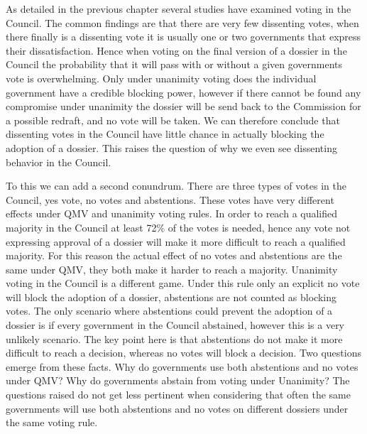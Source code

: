 As detailed in the previous chapter several studies have examined voting in the Council. The common findings are that there are very few dissenting votes, when there finally is a dissenting vote it is usually one or two governments that express their dissatisfaction. Hence when voting on the final version of a dossier in the Council the probability that it will pass with or without a given governments vote is overwhelming. Only under unanimity voting does the individual government have a credible blocking power, however if there cannot be found any compromise under unanimity the dossier will be send back to the Commission for a possible redraft, and no vote will be taken. We can therefore conclude that dissenting votes in the Council have little chance in actually blocking the adoption of a dossier. This raises the question of why we even see dissenting behavior in the Council. 

To this we can add a second conundrum. There are three types of votes in the Council, yes vote, no votes and abstentions. These votes have very different effects under QMV and unanimity voting rules. In order to reach a qualified majority in the Council at least 72\% of the votes is needed, hence any vote not expressing approval of a dossier will make it more difficult to reach a qualified majority. For this reason the actual effect of no votes and abstentions are the same under QMV, they both make it harder to reach a majority. Unanimity voting in the Council is a different game. Under this rule only an explicit no vote will block the adoption of a dossier, abstentions are not counted as blocking votes. The only scenario where abstentions could prevent the adoption of a dossier is if every government in the Council abstained, however this is a very unlikely scenario. The key point here is that abstentions do not make it more difficult to reach a decision, whereas no votes will block a decision. Two questions emerge from these facts. Why do governments use both abstentions and no votes under QMV? Why do governments abstain from voting under Unanimity? The questions raised do not get less pertinent when considering that often the same governments will use both abstentions and no votes on different dossiers under the same voting rule.


